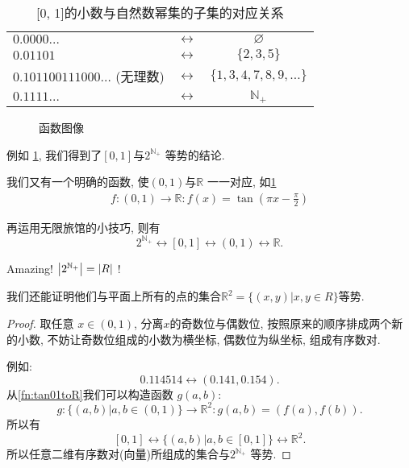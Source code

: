 \begin{table}
  \centering
    \begin{tabular}{lcc}
      \toprule
      $0. 0000\ldots $               & $\leftrightarrow$ &
      $\varnothing$                                                 \\
      $0. 01101$                     & $\leftrightarrow$ & $\{2, 3,
      5\}$                                                          \\
      $0. 101100111000\ldots $ (无理数) & $\leftrightarrow$ & $\{1, 3,
      4, 7, 8, 9,\ldots \}  $                                       \\
      $0. 1111\ldots $               & $\leftrightarrow$ &
      $\mathbb{N}_+$                                                \\
      \bottomrule
    \end{tabular}
    \caption{[0, 1]的小数与自然数幂集的子集的对应关系}
    \label{tbl:01to2N}
\end{table}

\begin{figure}
  \centering
    
    \caption{函数图像} \label{fig:tan}
\end{figure}

例如 \cref{tbl:01to2N},
我们得到了$\left[0, 1\right]$与$2^{\mathbb{N}_+} $ 等势的结论.

我们又有一个明确的函数, 使$\left(0, 1\right)$与$\mathbb{R}$ 一一对应, 如\cref{fig:tan}
\begin{align}
  f \colon (0, 1) \to \mathbb{R} \colon f(x) = \tan (\pi x -
  \frac{\pi}{2}) \label{fn:tan01toR}
\end{align}

再运用无限旅馆的小技巧, 则有
\[
  2^{\mathbb{N}_+}\leftrightarrow [0, 1] \leftrightarrow (0, 1)
  \leftrightarrow \mathbb{R}
.\]

Amazing! $\left\lvert 2^{\mathbb{N}_+} \right\rvert = \left\lvert R \right\rvert$ !

我们还能证明他们与平面上所有的点的集合$\mathbb{R}^{2} = \{(x,y)| x, y \in R\} $等势.

\begin{proof}

  取任意 $x \in (0, 1)$, 分离$x$的奇数位与偶数位, 按照原来的顺序排成两个新的小数,
  不妨让奇数位组成的小数为横坐标, 偶数位为纵坐标, 组成有序数对.

  例如:
  \[
    0. 114514 \leftrightarrow (0. 141, 0. 154)
  .\]
  从\cref{fn:tan01toR}我们可以构造函数 $g(a,b)$:
  \[
    g \colon \{(a,b) | a, b \in (0, 1) \}  \to \mathbb{R}^{2}  \colon
    g(a,b) = (f(a), f(b))
  .\]
  所以有
  \[
    [0, 1] \leftrightarrow \{(a,b)| a,b \in [0, 1]\} \leftrightarrow
    \mathbb{R}^{2}
  .\]
  所以任意二维有序数对(向量)所组成的集合与$2^{\mathbb{N}_+} $ 等势.
\end{proof}

